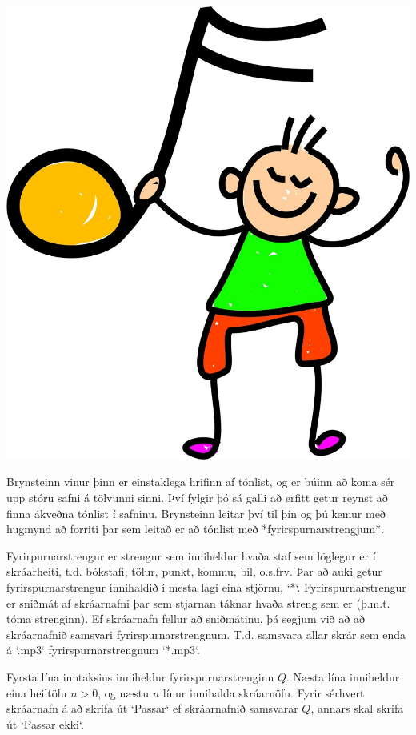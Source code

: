 
\includegraphics[scale=0.4]{hello.jpg}

Brynsteinn vinur þinn er einstaklega hrifinn af tónlist, og er búinn að koma
sér upp stóru safni á tölvunni sinni. Því fylgir þó sá galli að erfitt getur
reynst að finna ákveðna tónlist í safninu. Brynsteinn leitar því til þín og þú
kemur með hugmynd að forriti þar sem leitað er að tónlist með
*fyrirspurnarstrengjum*.

Fyrirpurnarstrengur er strengur sem inniheldur hvaða staf sem löglegur er
í skráarheiti, t.d. bókstafi, tölur, punkt, kommu, bil, o.s.frv. Þar að auki getur
fyrirspurnarstrengur innihaldið í mesta lagi eina stjörnu, `*`.
Fyrirspurnarstrengur er sniðmát af skráarnafni þar sem stjarnan táknar hvaða
streng sem er (þ.m.t. tóma strenginn). Ef skráarnafn fellur að sniðmátinu, þá
segjum við að að skráarnafnið samsvari fyrirspurnarstrengnum. T.d. samsvara
allar skrár sem enda á `.mp3` fyrirspurnarstrengnum `*.mp3`.

Fyrsta lína inntaksins inniheldur fyrirspurnarstrenginn $Q$. Næsta lína
inniheldur eina heiltölu $n > 0$, og næstu $n$ línur innihalda skráarnöfn.
Fyrir sérhvert skráarnafn á að skrifa út `Passar` ef skráarnafnið samsvarar
$Q$, annars skal skrifa út `Passar ekki`.
